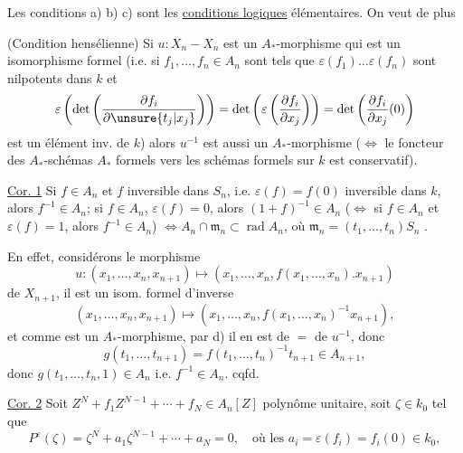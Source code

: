 Les conditions a) b) c) sont les \uline{conditions logiques} élémentaires. On veut de plus

 (Condition hensélienne) Si $u:X_n\mathbin{-}X_n$ est un $A_*$-morphisme qui est un isomorphisme formel (i.e. si $f_1,\ldots,f_n\in A_n$ sont tels que $\varepsilon(f_1)\ldots\varepsilon(f_n)$ sont nilpotents dans $k$ et
\[
\varepsilon\left(\det\left(\frac{\partial f_i}{\partial\unsure{t_j|x_j}}\right)\right)
=\det\left(\varepsilon\left(\frac{\partial f_i}{\partial x_j}\right)\right)
=\det\left(\frac{\partial f_i}{\partial x_j}(0)\right)
\]
est un élément inv. de $k$) alors $u^{-1}$ est aussi un $A_*$-morphisme ($\Leftrightarrow$ le foncteur des $A_*$-schémas $A_*$ formels vers les schémas formels sur $k$ est conservatif).

\uline{Cor. 1} Si $f\in A_n$ et $f$ inversible dans $S_n$, i.e. $\varepsilon(f)=f(0)$ inversible dans $k$, alors $f^{-1}\in A_n$;  si $f\in A_n$, $\varepsilon(f)=0$, alors $(1+f)^{-1}\in A_n$ ($\Leftrightarrow$ si $f\in A_n$ et $\varepsilon(f)=1$, alors $f^{-1}\in A_n$) $\Leftrightarrow A_n\cap\mathfrak m_n\subset\operatorname{rad}A_n$, où  $\mathfrak m_n=(t_1,\ldots,t_n)S_n$ .

En effet, considérons le  morphisme
\[
u:(x_1,\ldots,x_n,x_{n+1})\longmapsto
(x_1,\ldots,x_n,f(x_1,\ldots,x_n).x_{n+1})
\]
de $X_{n+1}$, il est un isom. formel d'inverse
\[
(x_1,\ldots,x_n,x_{n+1})\longmapsto
(x_1,\ldots,x_n,f(x_1,\ldots,x_n)^{-1}x_{n+1}),
\]
et comme   est un $A_*$-morphisme, par d) il en est de $=$ de $u^{-1}$, donc
\[
g(t_1,\ldots,t_{n+1})=f(t_1,\ldots,t_n)^{-1}t_{n+1}\in A_{n+1},
\]
 donc $g(t_1,\ldots,t_n,1)\in A_n$ i.e. $f^{-1}\in A_n$. cqfd.

\uline{Cor. 2} Soit  $Z^N+f_1Z^{N-1}+\cdots+f_N\in A_n[Z]$ polynôme unitaire, soit $\zeta\in k_0$ tel que
\[
P^\varepsilon(\zeta)=\zeta^N+a_1\zeta^{N-1}+\cdots+a_N=0,
\quad\text{où les }a_i=\varepsilon(f_i)=f_i(0)\in k_0,
\]

